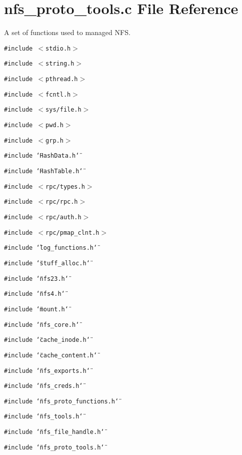 \section{nfs\_\-proto\_\-tools.c File Reference}
\label{nfs__proto__tools_8c}
A set of functions used to managed NFS. 

{\tt \#include $<$stdio.h$>$}\par
{\tt \#include $<$string.h$>$}\par
{\tt \#include $<$pthread.h$>$}\par
{\tt \#include $<$fcntl.h$>$}\par
{\tt \#include $<$sys/file.h$>$}\par
{\tt \#include $<$pwd.h$>$}\par
{\tt \#include $<$grp.h$>$}\par
{\tt \#include \char`\"{}Hash\-Data.h\char`\"{}}\par
{\tt \#include \char`\"{}Hash\-Table.h\char`\"{}}\par
{\tt \#include $<$rpc/types.h$>$}\par
{\tt \#include $<$rpc/rpc.h$>$}\par
{\tt \#include $<$rpc/auth.h$>$}\par
{\tt \#include $<$rpc/pmap\_\-clnt.h$>$}\par
{\tt \#include \char`\"{}log\_\-functions.h\char`\"{}}\par
{\tt \#include \char`\"{}stuff\_\-alloc.h\char`\"{}}\par
{\tt \#include \char`\"{}nfs23.h\char`\"{}}\par
{\tt \#include \char`\"{}nfs4.h\char`\"{}}\par
{\tt \#include \char`\"{}mount.h\char`\"{}}\par
{\tt \#include \char`\"{}nfs\_\-core.h\char`\"{}}\par
{\tt \#include \char`\"{}cache\_\-inode.h\char`\"{}}\par
{\tt \#include \char`\"{}cache\_\-content.h\char`\"{}}\par
{\tt \#include \char`\"{}nfs\_\-exports.h\char`\"{}}\par
{\tt \#include \char`\"{}nfs\_\-creds.h\char`\"{}}\par
{\tt \#include \char`\"{}nfs\_\-proto\_\-functions.h\char`\"{}}\par
{\tt \#include \char`\"{}nfs\_\-tools.h\char`\"{}}\par
{\tt \#include \char`\"{}nfs\_\-file\_\-handle.h\char`\"{}}\par
{\tt \#include \char`\"{}nfs\_\-proto\_\-tools.h\char`\"{}}\par
